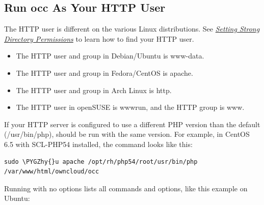 \documentclass[letterpaper,10pt,english]{sphinxmanual}
\def\PYGZhy{\char`\-}
\begin{document}
\subsection{Run occ As Your HTTP User}
\label{configuration_server/occ_command:run-occ-as-your-http-user}\label{configuration_server/occ_command:http-user-label}
The HTTP user is different on the various Linux distributions. See
{\hyperref[installation/installation_wizard:strong\string-perms\string-label]{\emph{Setting Strong Directory Permissions}}} to learn how to find your HTTP user.
\begin{itemize}
\item {} 
The HTTP user and group in Debian/Ubuntu is www-data.

\item {} 
The HTTP user and group in Fedora/CentOS is apache.

\item {} 
The HTTP user and group in Arch Linux is http.

\item {} 
The HTTP user in openSUSE is wwwrun, and the HTTP group is www.

\end{itemize}

If your HTTP server is configured to use a different PHP version than the
default (/usr/bin/php),  should be run with the same version. For
example, in CentOS 6.5 with SCL-PHP54 installed, the command looks like this:

\begin{Verbatim}[commandchars=\\\{\}]
sudo \PYGZhy{}u apache /opt/rh/php54/root/usr/bin/php /var/www/html/owncloud/occ
\end{Verbatim}

Running  with no options lists all commands and options, like this
example on Ubuntu:
\end{document}
